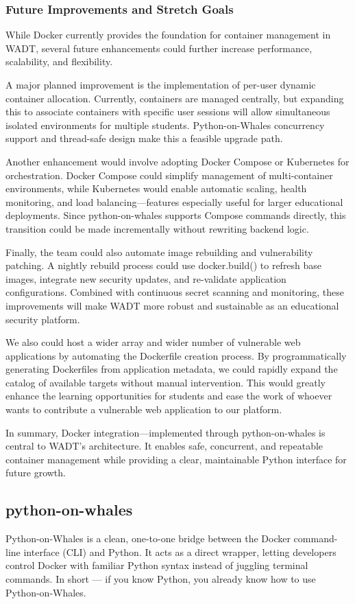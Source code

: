 \documentclass[12pt,titlepage]{article}
\begin{document}
\subsubsection{Future Improvements and Stretch Goals}
While Docker currently provides the foundation for container management in WADT, several future enhancements could further increase performance, scalability, and flexibility.

A major planned improvement is the implementation of per-user dynamic container allocation. Currently, containers are managed centrally, but expanding this to associate containers with specific user sessions will allow simultaneous isolated environments for multiple students. Python-on-Whales concurrency support and thread-safe design make this a feasible upgrade path.

Another enhancement would involve adopting Docker Compose or Kubernetes for orchestration. Docker Compose could simplify management of multi-container environments, while Kubernetes would enable automatic scaling, health monitoring, and load balancing—features especially useful for larger educational deployments. Since python-on-whales supports Compose commands directly, this transition could be made incrementally without rewriting backend logic.

Finally, the team could also automate image rebuilding and vulnerability patching. A nightly rebuild process could use docker.build() to refresh base images, integrate new security updates, and re-validate application configurations. Combined with continuous secret scanning and monitoring, these improvements will make WADT more robust and sustainable as an educational security platform.

We also could host a wider array and wider number of vulnerable web applications by automating the Dockerfile creation process. By programmatically generating Dockerfiles from application metadata, we could rapidly expand the catalog of available targets without manual intervention. This would greatly enhance the learning opportunities for students and ease the work of whoever wants to contribute a vulnerable web application to our platform.

In summary, Docker integration—implemented through python-on-whales is central to WADT’s architecture. It enables safe, concurrent, and repeatable container management while providing a clear, maintainable Python interface for future growth.


\subsection{python-on-whales}
Python-on-Whales is a clean, one-to-one bridge between the Docker command-line interface (CLI) and Python. 
It acts as a direct wrapper, letting developers control Docker with familiar Python syntax instead of juggling terminal commands. 
In short — if you know Python, you already know how to use Python-on-Whales.
\end{document}
